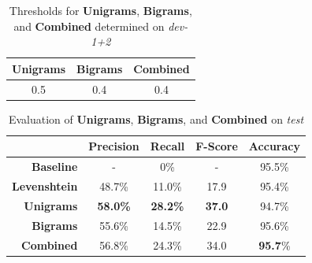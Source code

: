 \documentclass[a4paper,10pt]{scrartcl}
\theoremstyle{style}
\begin{document}
\begin{table}
\begin{center}
\begin{tabular}{|c|c|c|}
\hline
\textbf{Unigrams} & \textbf{Bigrams} & \textbf{Combined} \\
\hline
0.5 & 0.4 & 0.4\\
\hline
\end{tabular}
\end{center}
\caption{Thresholds for \textbf{Unigrams}, \textbf{Bigrams}, and \textbf{Combined} determined on \textit{dev-1+2}}
\label{thresholds}
\end{table}

\begin{table}
\begin{center}
\begin{tabular}{|r|c|c|c|c|}
\hline
& Precision & Recall & F-Score & Accuracy\\
\hline
\textbf{Baseline} & - & 0\% & - & 95.5\% \\
\hline
\textbf{Levenshtein} & 48.7\% & 11.0\% & 17.9 & 95.4\%\\
\hline
\textbf{Unigrams} & \textbf{58.0\%} & \textbf{28.2\%} & \textbf{37.0} & 94.7\%\\
\hline
\textbf{Bigrams} & 55.6\% & 14.5\% & 22.9 & 95.6\%\\
\hline
\textbf{Combined} & 56.8\% & 24.3\% & 34.0 & \textbf{95.7}\%\\
\hline
\end{tabular}
\end{center}
\caption{Evaluation of \textbf{Unigrams}, \textbf{Bigrams}, and \textbf{Combined} on \textit{test}}
\label{eval_redundancy}
\end{table}




\end{document}
